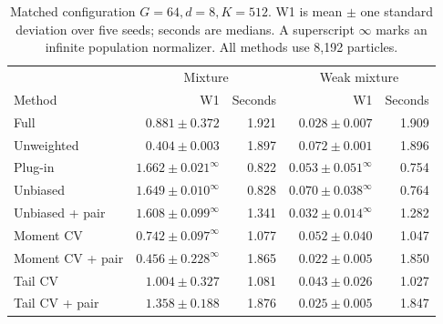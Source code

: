 \begin{table}[ht]
 \centering
 \caption{Matched configuration $G=64,d=8,K=512$. W1 is mean $\pm$ one standard deviation over five seeds; seconds are medians. A superscript $\infty$ marks an infinite population normalizer. All methods use 8,192 particles.}
 \label{tab:matched}
 \begin{tabular}{lrrrr}
 \toprule
 & \multicolumn{2}{c}{Mixture} & \multicolumn{2}{c}{Weak mixture}\\
 Method & W1 & Seconds & W1 & Seconds\\
 \midrule
 Full & $0.881\pm0.372$ & 1.921 & $0.028\pm0.007$ & 1.909\\
 Unweighted & $0.404\pm0.003$ & 1.897 & $0.072\pm0.001$ & 1.896\\
 Plug-in & $1.662\pm0.021^{\infty}$ & 0.822 & $0.053\pm0.051^{\infty}$ & 0.754\\
 Unbiased & $1.649\pm0.010^{\infty}$ & 0.828 & $0.070\pm0.038^{\infty}$ & 0.764\\
 Unbiased + pair & $1.608\pm0.099^{\infty}$ & 1.341 & $0.032\pm0.014^{\infty}$ & 1.282\\
 Moment CV & $0.742\pm0.097^{\infty}$ & 1.077 & $0.052\pm0.040$ & 1.047\\
 Moment CV + pair & $0.456\pm0.228^{\infty}$ & 1.865 & $0.022\pm0.005$ & 1.850\\
 Tail CV & $1.004\pm0.327$ & 1.081 & $0.043\pm0.026$ & 1.027\\
 Tail CV + pair & $1.358\pm0.188$ & 1.876 & $0.025\pm0.005$ & 1.847\\
 \bottomrule
 \end{tabular}
\end{table}
